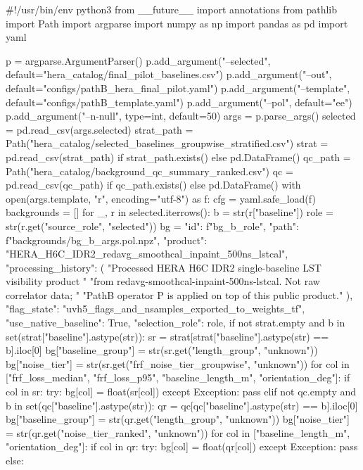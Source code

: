 #!/usr/bin/env python3
from __future__ import annotations
from pathlib import Path
import argparse
import numpy as np
import pandas as pd
import yaml

p = argparse.ArgumentParser()
p.add_argument("--selected", default="hera_catalog/final_pilot_baselines.csv")
p.add_argument("--out", default="configs/pathB_hera_final_pilot.yaml")
p.add_argument("--template", default="configs/pathB_template.yaml")
p.add_argument("--pol", default="ee")
p.add_argument("--n-null", type=int, default=50)
args = p.parse_args()
selected = pd.read_csv(args.selected)
strat_path = Path("hera_catalog/selected_baselines_groupwise_stratified.csv")
strat = pd.read_csv(strat_path) if strat_path.exists() else pd.DataFrame()
qc_path = Path("hera_catalog/background_qc_summary_ranked.csv")
qc = pd.read_csv(qc_path) if qc_path.exists() else pd.DataFrame()
with open(args.template, "r", encoding="utf-8") as f:
    cfg = yaml.safe_load(f)
backgrounds = []
for _, r in selected.iterrows():
    b = str(r["baseline"])
    role = str(r.get("source_role", "selected"))
    bg = {
        "id": f"bg_{b}_{role}",
        "path": f"backgrounds/bg_{b}_{args.pol}.npz",
        "product": "HERA_H6C_IDR2_redavg_smoothcal_inpaint_500ns_lstcal",
        "processing_history": (
            "Processed HERA H6C IDR2 single-baseline LST visibility product "
            "from redavg-smoothcal-inpaint-500ns-lstcal. Not raw correlator data; "
            "PathB operator P is applied on top of this public product."
        ),
        "flag_state": "uvh5_flags_and_nsamples_exported_to_weights_tf",
        "use_native_baseline": True,
        "selection_role": role,
    }
    if not strat.empty and b in set(strat["baseline"].astype(str)):
        sr = strat[strat["baseline"].astype(str) == b].iloc[0]
        bg["baseline_group"] = str(sr.get("length_group", "unknown"))
        bg["noise_tier"] = str(sr.get("frf_noise_tier_groupwise", "unknown"))
        for col in ["frf_loss_median", "frf_loss_p95", "baseline_length_m", "orientation_deg"]:
            if col in sr:
                try: bg[col] = float(sr[col])
                except Exception: pass
    elif not qc.empty and b in set(qc["baseline"].astype(str)):
        qr = qc[qc["baseline"].astype(str) == b].iloc[0]
        bg["baseline_group"] = str(qr.get("length_group", "unknown"))
        bg["noise_tier"] = str(qr.get("noise_tier_ranked", "unknown"))
        for col in ["baseline_length_m", "orientation_deg"]:
            if col in qr:
                try: bg[col] = float(qr[col])
                except Exception: pass
    else:
